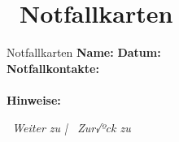 \section*{\textcolor{ctmmBlue}{\faHeartbeat{}~Notfallkarten}}
\label{sec:notfallkarten}

\begin{ctmmBlueBox}{Notfallkarten}
\textbf{Name:}  \quad \textbf{Datum:} \\
\vspace{0.5cm}
\textbf{Notfallkontakte:}\\
\\
\vspace{0.5cm}
\textbf{Hinweise:}\\
\end{ctmmBlueBox}

\vspace{1cm}
\begin{center}
\textit{\textcolor{ctmmGreen}{\faChevronRight~Weiter zu}  | \textcolor{ctmmBlue}{\faChevronLeft~Zur√ºck zu} }
\end{center}
